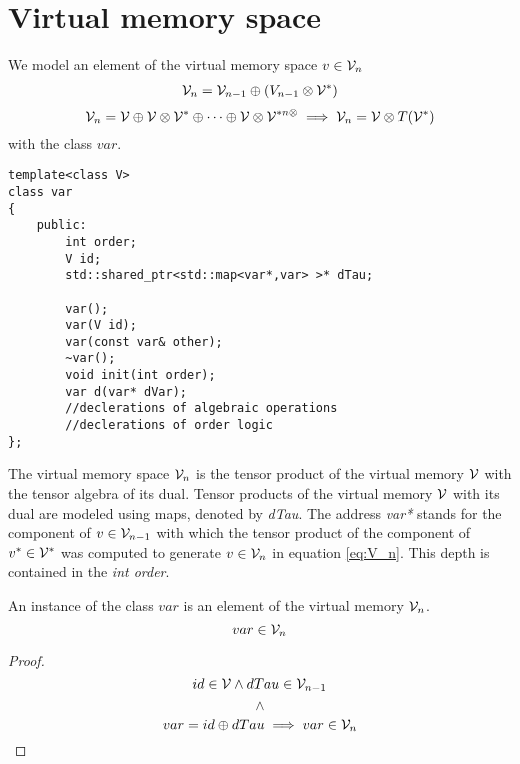 \section{Virtual memory space}\label{sec:virtualMemory}

We model an element of the virtual memory space $v\in\mathcal{V}_n$ \cite[Definition~4.1]{OperationalCalculus}
\begin{eqnarray}
\mathcal{V}_{n}=\mathcal{V}_{n-1}\oplus(V_{n-1}\otimes\mathcal{V}^*) \label{eq:V_n}
\end{eqnarray}
\begin{equation}
\mathcal{V}_{n}=\mathcal{V}\oplus\mathcal{V}\otimes\mathcal{V}^*\oplus\cdots\oplus\mathcal{V}\otimes\mathcal{V}^{*n\otimes} \implies\mathcal{V}_n=\mathcal{V}\otimes T(\mathcal{V}^*)
\end{equation}
with the class $var$.

\begin{lstlisting}
template<class V>
class var
{
    public:
    	int order;
        V id;
        std::shared_ptr<std::map<var*,var> >* dTau;

        var();
        var(V id);
        var(const var& other);
        ~var();
        void init(int order);
        var d(var* dVar);
        //declerations of algebraic operations
        //declerations of order logic
};
\end{lstlisting}

The virtual memory space $\mathcal{V}_n$ is the tensor product of the virtual memory $\mathcal{V}$ with the tensor algebra of its dual. Tensor products of the virtual memory $\mathcal{V}$ with its dual are modeled using maps, denoted by \emph{dTau}. The address \emph{var*} stands for the component of $v\in\mathcal{V}_{n-1}$ with which the tensor product of the component of $v^*\in\mathcal{V}^*$ was computed to generate $v\in\mathcal{V}_n$ in equation \eqref{eq:V_n}. This depth is contained in the \emph{int order}.

 \begin{izrek}
 An instance of the class $var$ is an element of the virtual memory $\mathcal{V}_n$.
  \begin{equation}
  var\in\mathcal{V}_n
  \end{equation}
 \end{izrek}
 \begin{proof}
 \begin{equation}
  id\in \mathcal{V}\land  dTau\in \mathcal{V}_{n-1}
  \end{equation}
  $$\land$$
  \begin{equation}
  var=id\oplus dTau\implies var\in\mathcal{V}_n
  \end{equation}
 \end{proof}

